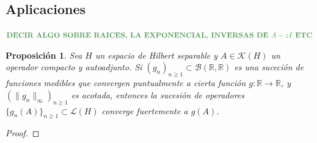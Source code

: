 \documentclass[11pt]{report}
\theoremstyle{colored}
\newtheorem{proposition}{Proposición}[section]
\newcommand{\R}{\mathbb{R}}
\newcommand{\paint}[1]{\color{color}{#1}}
\newcommand{\tpaint}[1]{\paint{\textbf{#1}}}
\begin{document}
\subsection{Aplicaciones}

$\tpaint{\textbf{DECIR ALGO SOBRE RAICES, LA EXPONENCIAL, INVERSAS DE $A-zI$ ETC}}$

\begin{proposition}
Sea $H$ un espacio de Hilbert separable y $A \in \mathscr{K}(H)$ un operador compacto y autoadjunto. Si $(g_n)_{n \geq 1} \subset \mathcal{B}(\R,\R)$ es una suceción de funciones medibles que convergen puntualmente a cierta función $g : \R \to \R$, y $(\|g_n\|_\infty)_{n \geq 1}$ es acotada, entonces la sucesión de operadores $\{g_n(A)\}_{n \geq 1} \subset \mathscr{L}(H)$ converge fuertemente a $g(A)$.
\end{proposition}
\begin{proof}

\end{proof}
\end{document}

